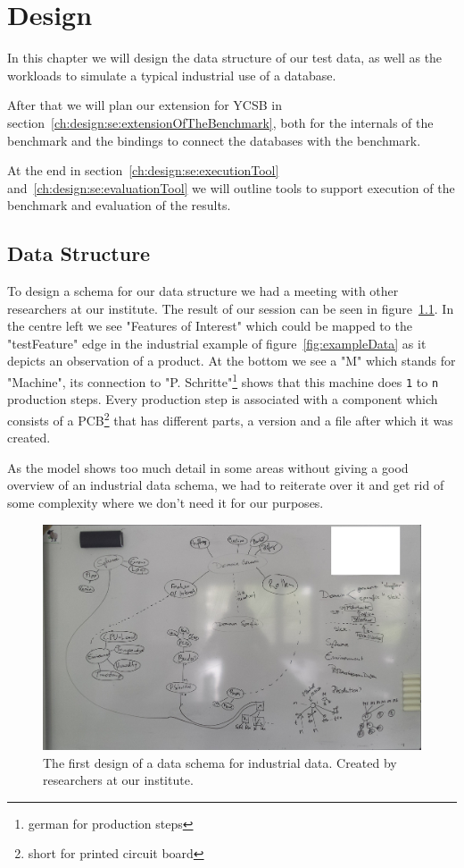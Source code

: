 \chapter{Design}
\label{ch:design}

In this chapter we will design the data structure of our test data,
as well as the workloads to simulate a typical industrial use of a database.

After that we will plan our extension for YCSB in section~\ref{ch:design:se:extensionOfTheBenchmark},
both for the internals of the benchmark and the bindings to connect the databases with the benchmark.

At the end in section~\ref{ch:design:se:executionTool} and~\ref{ch:design:se:evaluationTool} we will outline tools to support execution of the benchmark and evaluation of the results.

\section{Data Structure}
\label{ch:design:se:dataStructure}
To design a schema for our data structure we had a meeting with other researchers at our institute.
The result of our session can be seen in figure~\ref{fig:firstDesignOfSchema}.
In the centre left we see "Features of Interest" which could be mapped to the "testFeature" edge in the industrial example of figure~\ref{fig:exampleData} as it depicts an observation of a product.
At the bottom we see a "M" which stands for "Machine",
its connection to "P. Schritte"\footnote{german for production steps} shows that this machine does \texttt{1} to \texttt{n} production steps.
Every production step is associated with a component which consists of a PCB\footnote{short for printed circuit board} that has different parts,
a version and a file after which it was created.

As the model shows too much detail in some areas without giving a good overview of an industrial data schema,
we had to reiterate over it and get rid of some complexity where we don't need it for our purposes.

\begin{figure}
  \centering
  \includegraphics[width=\textwidth]{images/design/firstDesignOfSchema}
  \caption{The first design of a data schema for industrial data. Created by researchers at our institute.}
  \label{fig:firstDesignOfSchema}
\end{figure}

